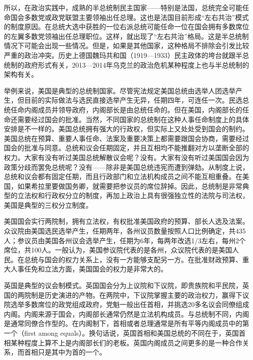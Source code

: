 所以，在政治实践中，成熟的半总统制民主国家——特别是法国，总统完全可能任命国会多数党或政党联盟主要领袖出任总理。这也是法国目前形成“左右共治”模式的制度原因。在总统大选中获胜的一位右派总统可能任命一位在国会拥有多数席位的左翼多数党领袖出任总理职位。这样，就出现了“左右共治”格局。这是半总统制情况下可能会出现一些情况。但是，如果是其他国家，这种格局不排除会引发比较严重的政治冲突。历史上德国魏玛共和国（1919—1933）民主政体的垮台就跟半总统制的政府形式有关，2013—2014年乌克兰的政治危机某种程度上也与半总统制的架构有关。

举例来说，美国是典型的总统制国家。尽管宪法规定美国总统由选举人团选举产生，但目前的实际做法与选民直接选举产生无异，任期四年，可连任一次。民选总统任命内阁成员并领导政府，内阁部长是由总统任命的。但在美国，内阁部长的任命还需要经过国会的批准。当然，不同国家的总统制在这种人事任命制度上的具体安排是不一样的。美国总统拥有强大的行政权，但实际上又处处受到国会的制约。美国总统在预算、重要人事任命、法案及重要决策上都需要跟国会协商，需要经过国会的批准与同意。总统和议会任期固定，并且互相均不能推翻对方以垄断全部的权力。大家有没有听过美国总统解散议会呢？没有。大家有没有听过美国国会因为政策分歧而罢免总统呢？没有——除非是美国总统违宪而遭到弹劾。从制度上说，总统和议会都有固定任期，而且行政部门和立法机构成员之间不能互相重叠。在美国，如果希拉里要做国务卿，就需要把参议员的席位辞掉。因此，总统制是非常典型的立法权和行政权分立的制度，再加上政治上具有很强独立性的法院与司法权，美国是典型的三权分立制度。

美国国会实行两院制，拥有立法权，有权批准美国政府的预算、部长人选及法案。众议院由美国选民选举产生，任期两年，各州议员数量按照人口比例确定，共435人；参议员由美国各州议会选举产生，任期为6年，每两年改选1/3左右，每州2个席位，共100人。一般认为，美国参议院代表的是各州，众议院代表的是美国人民。在总统与国会的权力关系上，没有一方能够支配另一方。在批准财政预算、重大人事任免和立法方面，美国国会的权力是非常大的。

英国是典型的议会制模式。英国国会分为上议院和下议院，即贵族院和平民院，英国的两院制是历史演进的产物。在两院中，下议院掌握主要的政治权力，赢得下议院选举多数席位的政党组成政府，党魁一般出任首相，并挑选20多名议会同僚组成内阁。内阁来源于国会，内阁部长通常仍然是立法机构成员。与总统制不同，内阁是通常同僚合作型的。在内阁制下，首相或者总理通常是所有平等内阁成员中的第一个（first among equals）。换句话说，英国首相和美国总统的不同在于，英国首相某种程度上算不上是内阁部长们的老板。英国内阁成员之间更多的是一种合作关系，而首相只是其中为首的一个。

